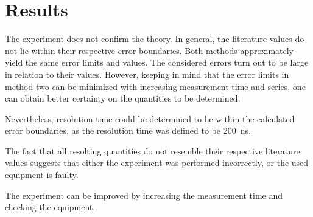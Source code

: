 \chapter{Results}
The experiment does not confirm the theory.
In general, the literature values do not lie within their respective error boundaries.
Both methods approximately yield the same error limits and values.
The considered errors turn out to be large in relation to their values.
However, keeping in mind that the error limits in method two can be minimized with increasing measurement time and series, one can obtain better certainty on the quantities to be determined.

Nevertheless, resolution time could be determined to lie within the calculated error boundaries, as the resolution time was defined to be \SI{200}{\ns}.

The fact that all resolting quantities do not resemble their respective literature values suggests that either the experiment was performed incorrectly, or the used equipment is faulty.

The experiment can be improved by increasing the measurement time and checking the equipment.

